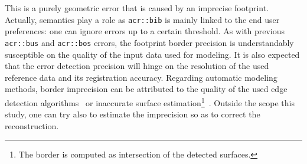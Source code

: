                 \begin{figure}[htb]
                    \centering
                \end{figure}

                This is a purely geometric error that is caused by an imprecise footprint.
                Actually, semantics play a role as \texttt{\gls{acr::bib}} is mainly linked to the end user preferences: one can ignore errors up to a certain threshold. 
                As with previous \texttt{\gls{acr::bus}} and \texttt{\gls{acr::bos}} errors, the footprint border precision is understandably susceptible on the quality of the input data used for modeling.
                It is also expected that the error detection precision will hinge on the resolution of the used reference data and its registration accuracy.
                Regarding automatic modeling methods, border imprecision can be attributed to the quality of the used edge detection algorithms~\parencite{baillard1999automatic,werner2002new,nan2015template} or inaccurate surface estimation\footnote{
                    The border is computed as intersection of the detected surfaces.
                }~\parencite{durupt2006automatic,xiong2014graph}.
                Outside the scope this study, one can try also to estimate the imprecision so as to correct the reconstruction.

